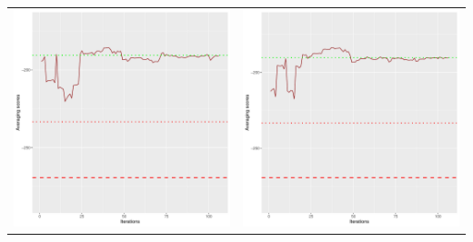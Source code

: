 \documentclass[]{scrartcl}
\begin{document}
\begin{table}[h!]
\begin{tabular}{cc}
\includegraphics[scale = 0.4]{./figs/asia/v1/10/avgBoundsEvolution-107.pdf} & 
\includegraphics[scale = 0.4]{./figs/asia/v1/20/avgBoundsEvolution-107.pdf} \\

\end{tabular}
\end{table}
\end{document}
